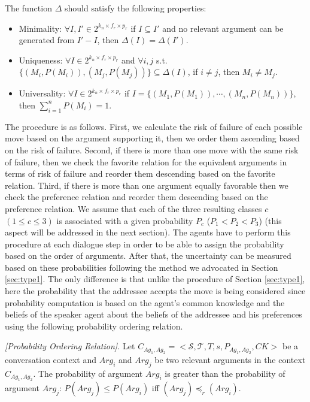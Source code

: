 The function $\Delta$ should satisfy the following properties:

\begin{itemize}
\item   Minimality: $\forall I, I' \in 2^{k_n \times f_{r} \times
p_{r} }$ if $I \subseteq I'$ and no relevant argument can be
generated from $I'-I$, then $\Delta (I) = \Delta(I')$.

\item Uniqueness: $\forall I \in 2^{k_n \times f_{r} \times p_{r}
}$ and $\forall i, j$ s.t. $\{(M_i,P(M_i )),(M_j,P(M_j))\}
\subseteq \Delta(I)$, if $i \neq j$, then $M_i \neq M_j$.


\item Universality: $\forall I \in 2^{k_n \times f_{r} \times
p_{r} }$ if $I = \{(M_1,P(M_1)), \cdots ,(M_n,P(M_n ))\}$, then
$\sum_{i=1}^n P(M_i)=1 $.

\end{itemize}

The procedure is as follows. First, we calculate the risk of failure of each possible move based on the argument supporting it,
then we order them ascending based on the risk of failure. Second, if there is more than one move with the same risk of failure, then
we check the favorite relation for the equivalent arguments in terms of risk of failure and reorder them descending based on the
favorite relation. Third, if there is more than one argument equally favorable then we check the preference relation and
reorder them descending based on the preference relation. We assume that each of the three resulting classes $c$ $(1 \leq c
\leq 3)$ is associated with a given probability $P_c$ ($P_1 < P_2 < P_3$) (this aspect will be addressed in the next section). The
agents have to perform this procedure at each dialogue step in order to be able to assign the probability based on the order of
arguments. After that, the uncertainty can be measured based on these probabilities following the method we advocated in Section
\ref{sec:type1}. The only difference is that unlike the procedure of Section \ref{sec:type1}, here the probability that the
addressee accepts the move is being considered since probability computation is based on the agent's common knowledge and the
beliefs of the speaker agent about the beliefs of the addressee and his preferences using the following probability ordering
relation.
\begin{definition}{\emph{[Probability Ordering Relation]. }} \label{probabilityorderingrelation}
Let $C_{Ag_1,Ag_2} = \big<\mathcal{S},\mathcal{T},T, s,P_{Ag_1,Ag_2},CK\big>$ be a conversation context and $Arg_i$ and
$Arg_j$ be two relevant arguments in the context $C_{Ag_1,Ag_2}$. The probability of argument $Arg_i$ is greater than the
probability of argument $Arg_j$: $P(Arg_j) \leq P(Arg_i)$ iff $(Arg_j) \preceq_r (Arg_i)$.
\end{definition}

